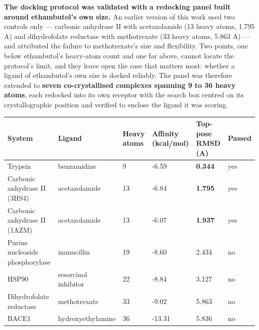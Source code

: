 \documentclass[utf8]{FrontiersinVancouver}
\begin{document}
\textbf{The docking protocol was validated with a redocking panel built around ethambutol's own size.} An earlier version of this work used two controls only --- carbonic anhydrase II with acetazolamide (13 heavy atoms, 1.795 A) and dihydrofolate reductase with methotrexate (33 heavy atoms, 5.863 A) --- and attributed the failure to methotrexate's size and flexibility. Two points, one below ethambutol's heavy-atom count and one far above, cannot locate the protocol's limit, and they leave open the case that matters most: whether a ligand of ethambutol's own size is docked reliably. The panel was therefore extended to \textbf{seven co-crystallised complexes spanning 9 to 36 heavy atoms}, each redocked into its own receptor with the search box centred on its crystallographic position and verified to enclose the ligand it was scoring.

\begin{table}[htbp]
\centering
\begin{tabular}{llllll}
\hline
System & Ligand & Heavy atoms & Affinity (kcal/mol) & Top-pose RMSD (A) & Passed \\
\hline
Trypsin & benzamidine & 9 & -6.59 & \textbf{0.344} & yes \\
Carbonic anhydrase II (3HS4) & acetazolamide & 13 & -6.84 & \textbf{1.795} & yes \\
Carbonic anhydrase II (1AZM) & acetazolamide & 13 & -6.07 & \textbf{1.937} & yes \\
Purine nucleoside phosphorylase & immucillin & 19 & -8.60 & 2.434 & no \\
HSP90 & resorcinol inhibitor & 22 & -8.84 & 3.127 & no \\
Dihydrofolate reductase & methotrexate & 33 & -9.02 & 5.863 & no \\
BACE1 & hydroxyethylamine & 36 & -13.31 & 5.836 & no \\
\hline
\end{tabular}
\end{table}
\end{document}
